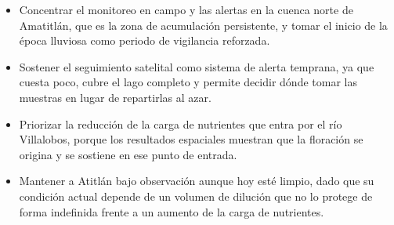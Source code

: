 \documentclass[10pt,a4paper]{article}
\begin{document}
\begin{itemize}
  \item Concentrar el monitoreo en campo y las alertas en la cuenca norte de Amatitlán, que es la zona de
  acumulación persistente, y tomar el inicio de la época lluviosa como periodo de vigilancia reforzada.
  \item Sostener el seguimiento satelital como sistema de alerta temprana, ya que cuesta poco, cubre el lago
  completo y permite decidir dónde tomar las muestras en lugar de repartirlas al azar.
  \item Priorizar la reducción de la carga de nutrientes que entra por el río Villalobos, porque los resultados
  espaciales muestran que la floración se origina y se sostiene en ese punto de entrada.
  \item Mantener a Atitlán bajo observación aunque hoy esté limpio, dado que su condición actual depende de un
  volumen de dilución que no lo protege de forma indefinida frente a un aumento de la carga de nutrientes.
\end{itemize}
\end{document}
